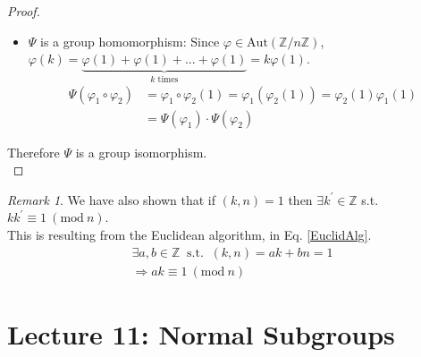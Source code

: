 \documentclass{article}
\theoremstyle{definition}
\theoremstyle{remark}
\newtheorem*{remark}{Remark}
\begin{document}
\begin{proof}
\begin{itemize}
		\item $\Psi$ is a group homomorphism:
			  Since $\varphi\in\mathrm{Aut}(\mathbb{Z}/n\mathbb{Z})$, $\varphi(k)=\underbrace{\varphi(1)+\varphi(1)+...+\varphi(1)}_{k\text{ times}}=k\varphi(1)$.\\
		      \begin{align*}
			      \Psi(\varphi_1\circ\varphi_2) & =\varphi_1\circ\varphi_2(1) =\varphi_1(\varphi_2(1))=\varphi_2(1)\varphi_1(1) \\
			                                    & =\Psi(\varphi_1)\cdot\Psi(\varphi_2)
			  \end{align*}
	\end{itemize}
	Therefore $\Psi$ is a group isomorphism.\\
\end{proof}
\begin{remark}
	We have also shown that if $(k,n)=1$ then $\exists k^{\prime}\in\mathbb{Z}$ s.t. $kk^{\prime}\equiv 1~(\mathrm{mod}~n)$.\\
	This is resulting from the Euclidean algorithm, in Eq. \ref{EuclidAlg}.\\
	\begin{align*}
		\exists a,b\in\mathbb{Z}~\text{ s.t. }~(k,n)=ak+bn=1\\
		\Rightarrow ak\equiv 1~(\mathrm{mod}~n)
	\end{align*} 
\end{remark}
\newpage
\section{Lecture 11: Normal Subgroups}
\end{document}
